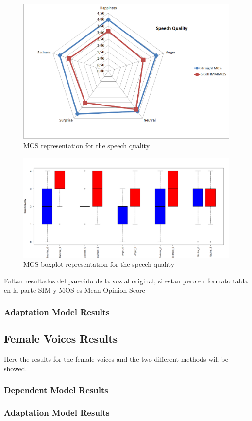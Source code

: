 \begin{figure}[!htb]
	\begin{center}
	\includegraphics[width=1\textwidth]{results/Vocoders1_joa_MOS.png}
	\end{center}
	\caption{\label{joa2-ES-1}MOS representation for the speech quality}
\end{figure}
\begin{figure}[!htb]
	\begin{center}
	\includegraphics[width=1\textwidth]{results/Vocoders1_joa_MOS_boxplot.png}
	\end{center}
	\caption{\label{joa2-MOS-1}MOS boxplot representation for the speech quality}
\end{figure}

Faltan resultados del parecido de la voz al original, si estan pero en formato tabla en la parte SIM  y MOS es Mean Opinion Score

\subsubsection{Adaptation Model Results}\label{madaptresults}
\subsection{Female Voices Results}\label{femaleres}
Here the results for the female voices and the two different methods will be showed.\\
\subsubsection{Dependent Model Results}\label{fdpmresults}
\subsubsection{Adaptation Model Results}\label{fadaptresults}